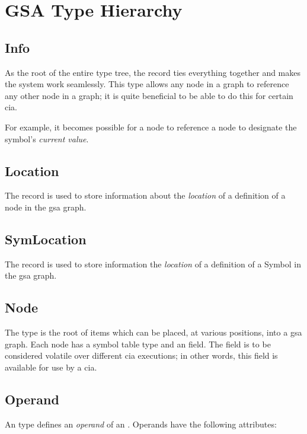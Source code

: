 \section{GSA Type Hierarchy}
\subsection{Info}

As the root of the entire type tree, the  record ties
everything together and makes the system work seamlessly.  This type
allows any node in a graph to reference any other node in a graph; it
is quite beneficial to be able to do this for certain \ac{cia}.

For example, it becomes possible for a  node to reference
a  node to designate the symbol's \emph{current value}.

\subsection{Location}

The  record is used to store information about the
\emph{location} of a definition of a node in the \ac{gsa} graph.

\subsection{SymLocation}

The  record is used to store information the
\emph{location} of a definition of a Symbol in the \ac{gsa} graph.

\subsection{Node}

The  type is the root of items which can be placed, at
various positions, into a \ac{gsa} graph.  Each node has a symbol
table type and an  field.  The  field is to be
considered volatile over different \ac{cia} executions; in other
words, this field is available for use by a \ac{cia}.

\subsection{Operand}

An  type defines an \emph{operand} of an
.  Operands have the following attributes:

